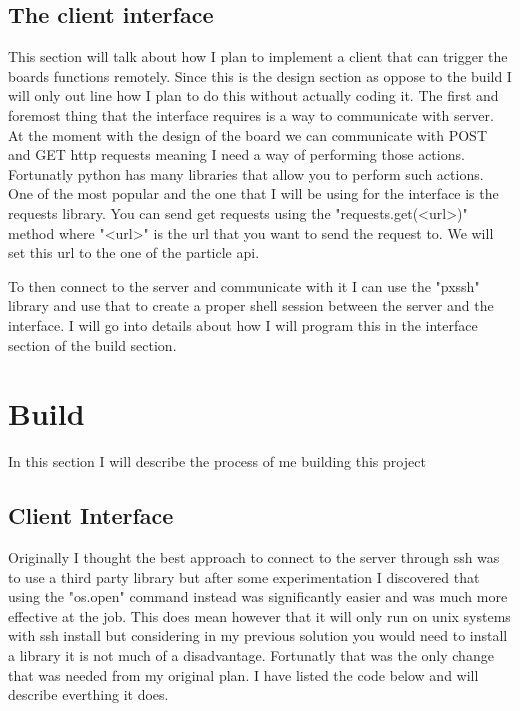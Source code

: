 \documentclass{article}
\newcommand\mylstcaption{}
\begin{document}
\subsection{The client interface}
This section will talk about how I plan to implement a client that can trigger the boards functions
remotely. Since this is the design section as oppose to the build I will only out line how I plan to
do this without actually coding it. The first and foremost thing that the interface requires is a
way to communicate with server. At the moment with the design of the board we can communicate with
POST and GET http requests meaning I need a way of performing those actions. Fortunatly python has
many libraries that allow you to perform such actions. One of the most popular and the one that I
will be using for the interface is the requests library\cite{pythonRequests}. You can send get
requests using the "requests.get(<url>)" method where "<url>" is the url that you want to send the
request to. We will set this url to the one of the particle api.

To then connect to the server and communicate with it I can use the "pxssh" library and use that to
create a proper shell session between the server and the interface. I will go into details about
how I will program this in the interface section of the build section.


\section{Build}
In this section I will describe the process of me building this project

\subsection{Client Interface}
Originally I thought the best approach to connect to the server through ssh was to use a third party library
but after some experimentation I discovered that using the "os.open" command instead was significantly
easier and was much more effective at the job. This does mean however that it will only run on unix systems
with ssh install but considering in my previous solution you would need to install a library it is not
much of a disadvantage. Fortunatly that was the only change that was needed from my original plan. I have
listed the code below and will describe everthing it does.

\begin{mdlisting}
        
\end{mdlisting}
\end{document}
